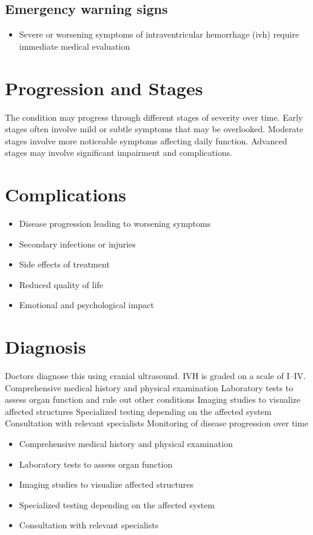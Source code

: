 \subsection{Emergency warning signs}
\begin{itemize}[noitemsep]
  \item Severe or worsening symptoms of intraventricular hemorrhage (ivh) require immediate medical evaluation
\end{itemize}
\section{Progression and Stages}
The condition may progress through different stages of severity over time. Early stages often involve mild or subtle symptoms that may be overlooked. Moderate stages involve more noticeable symptoms affecting daily function. Advanced stages may involve significant impairment and complications.
\section{Complications}
\begin{itemize}[noitemsep]
  \item Disease progression leading to worsening symptoms
  \item Secondary infections or injuries
  \item Side effects of treatment
  \item Reduced quality of life
  \item Emotional and psychological impact
\end{itemize}
\section{Diagnosis}
Doctors diagnose this using cranial ultrasound. IVH is graded on a scale of I--IV. Comprehensive medical history and physical examination Laboratory tests to assess organ function and rule out other conditions Imaging studies to visualize affected structures Specialized testing depending on the affected system Consultation with relevant specialists Monitoring of disease progression over time

\begin{itemize}[noitemsep]
  \item Comprehensive medical history and physical examination
  \item Laboratory tests to assess organ function
  \item Imaging studies to visualize affected structures
  \item Specialized testing depending on the affected system
  \item Consultation with relevant specialists
\end{itemize}
